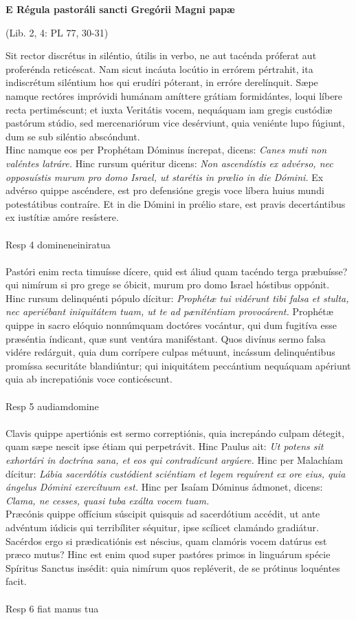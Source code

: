 \documentclass[options]{article}
\begin{document}
	\textbf{E Régula pastoráli sancti Gregórii Magni papæ}\\
	\begin{flushright}
		(Lib. 2, 4: PL 77, 30-31)
	\end{flushright}
	Sit rector discrétus in siléntio, útilis in verbo, ne aut tacénda próferat aut proferénda reticéscat. Nam sicut incáuta locútio in errórem pértrahit, ita indiscrétum siléntium hos qui erudíri póterant, in erróre derelínquit. Sæpe namque rectóres impróvidi humánam amíttere grátiam formidántes, loqui líbere recta pertiméscunt; et iuxta Veritátis vocem, nequáquam iam gregis custódiæ pastórum stúdio, sed mercenariórum vice desérviunt, quia veniénte lupo fúgiunt, dum se sub siléntio abscóndunt.\\
	Hinc namque eos per Prophétam Dóminus íncrepat, dicens:
	\textit{Canes muti non valéntes latráre.}
	Hinc rursum quéritur dicens: 
	\textit{Non ascendístis ex advérso, nec opposuístis murum pro domo Israel, ut starétis in prœlio in die Dómini.}
	 Ex advérso quippe ascéndere, est pro defensióne gregis voce líbera huius mundi potestátibus contraíre. Et in die Dómini in pr\'{œ}lio stare, est pravis decertántibus ex iustítiæ amóre resístere.\\
	 \\
	 Resp 4 domineneiniratua \\
	 \\
	  Pastóri enim recta timuísse dícere, quid est áliud quam tacéndo terga præbuísse? qui nimírum si pro grege se óbicit, murum pro domo Israel hóstibus oppónit. Hinc rursum delinquénti pópulo dícitur: 
	  \textit{Prophétæ tui vidérunt tibi falsa et stulta, nec aperiébant iniquitátem tuam, ut te ad pæniténtiam provocárent.}
	  Prophétæ quippe in sacro elóquio nonnúmquam doctóres vocántur, qui dum fugitíva esse præséntia índicant, quæ sunt ventúra maniféstant. Quos divínus sermo falsa vidére redárguit, quia dum corrípere culpas métuunt, incássum delinquéntibus promíssa securitáte blandiúntur; qui iniquitátem peccántium nequáquam apériunt quia ab increpatiónis voce conticéscunt.\\
	  \\
	  Resp 5 audiamdomine\\
	  \\
	  Clavis quippe apertiónis est sermo correptiónis, quia increpándo culpam détegit, quam sæpe nescit ipse étiam qui perpetrávit. Hinc Paulus ait: 
	  \textit{Ut potens sit exhortári in doctrína sana, et eos qui contradícunt argúere.}
	  Hinc per Malachíam dícitur:
	  \textit{Lábia sacerdótis custódient sciéntiam et legem requírent ex ore eius, quia ángelus Dómini exercítuum est.}
	  Hinc per Isaíam Dóminus ádmonet, dicens: 
	  \textit{Clama, ne cesses, quasi tuba exálta vocem tuam.}\\
	  Præcónis quippe offícium súscipit quisquis ad sacerdótium accédit, ut ante advéntum iúdicis qui terribíliter séquitur, ipse scílicet clamándo gradiátur. Sacérdos ergo si prædicatiónis est néscius, quam clamóris vocem datúrus est præco mutus? Hinc est enim quod super pastóres primos in linguárum spécie Spíritus Sanctus insédit: quia nimírum quos repléverit, de se prótinus loquéntes facit.\\
	  \\
	  
	  Resp 6 fiat manus tua
	  
\end{document}
